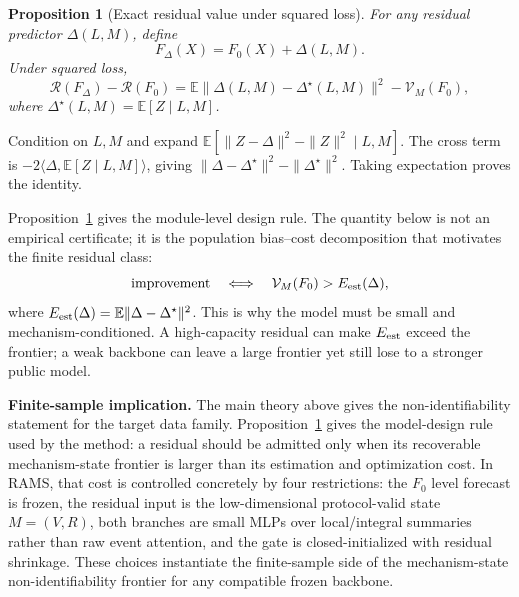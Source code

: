 ﻿\documentclass[10pt,conference]{IEEEtran}
\newtheorem{proposition}{Proposition}
\newcommand{\E}{\mathbb{E}}
\newcommand{\method}{\textnormal{\mbox{RAMS}}}
\begin{document}
\begin{proposition}[Exact residual value under squared loss]
\label{prop:residual-value}
For any residual predictor \(\Delta(L,M)\), define
\begin{equation}
F_\Delta(X)=F_0(X)+\Delta(L,M).
\end{equation}
Under squared loss,
\begin{equation}
\mathcal{R}(F_\Delta)-\mathcal{R}(F_0)
=
\E\|\Delta(L,M)-\Delta^\star(L,M)\|^2
-\mathcal{V}_M(F_0),
\end{equation}
where \(\Delta^\star(L,M)=\E[Z\mid L,M]\).
\end{proposition}

\begin{IEEEproof}
Condition on \(L,M\) and expand
\(\E[\|Z-\Delta\|^2-\|Z\|^2\mid L,M]\).  The cross term is
\(-2\langle\Delta,\E[Z\mid L,M]\rangle\), giving
\(\|\Delta-\Delta^\star\|^2-\|\Delta^\star\|^2\).  Taking expectation proves
the identity.
\end{IEEEproof}

Proposition~\ref{prop:residual-value} gives the module-level design rule.  The
quantity below is not an empirical certificate; it is the population bias--cost
decomposition that motivates the finite residual class:
\begin{equation}
\text{improvement}
\quad\Longleftrightarrow\quad
\mathcal{V}_M(F_0) > E_{\rm est}(\Delta),
\end{equation}
where \(E_{\rm est}(\Delta)=\E\|\Delta-\Delta^\star\|^2\).  This is why the
model must be small and mechanism-conditioned.  A high-capacity residual
can make \(E_{\rm est}\) exceed the frontier; a weak backbone can leave a large
frontier yet still lose to a stronger public model.

\textbf{Finite-sample implication.}
The main theory above gives the non-identifiability statement for the target
data family.  Proposition~\ref{prop:residual-value} gives
the model-design rule used by the method: a residual should be admitted
only when its recoverable mechanism-state frontier is larger than its
estimation and optimization cost.  In \method{}, that cost is controlled
concretely by four restrictions: the \(F_0\) level forecast is frozen, the
residual input is the low-dimensional protocol-valid state \(M=(V,R)\), both
branches are small MLPs over local/integral summaries rather than raw event
attention, and the gate is closed-initialized with residual shrinkage.  These
choices instantiate the finite-sample side of the mechanism-state
non-identifiability frontier for any compatible frozen backbone.
\end{document}
